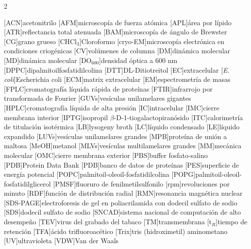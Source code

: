 \begin{multicols}{2}
\begin{acronym}[SDS-PAGE] %
    [ACN]{acetonitrilo}
    [AFM]{microscopía de fuerza atómica}
    [APL]{área por lípido}
    [ATR]{reflectancia total atenuada}
    [BAM]{microscopía de ángulo de Brewster}
    [CG]{grano grueso}
    [CHCl$_3$]{Cloroformo}
    [cryo-EM]{microscopía electrónica en condiciones criogénicas}
    [CV]{volúmenes de columna}
    [DM]{dinámica molecular}
    [MD]{dinámica molecular}
    [DO$_{600}$]{densidad óptica a 600 nm}
    [DPPC]{dipalmitoilfosfatidilcolina}
    [DTT]{DL-Ditiotreitol}
    [EC]{extracelular}
    [\textit{E. coli}]{Escherichia coli}
    [ECM]{matrix extracelular}
    [EM]{espectrometría de masas}
    [FPLC]{cromatografía líquida rápida de proteínas}
    [FTIR]{infrarrojo por transformada de Fourier}
    [GUVs]{vesículas unilamelares gigantes}
    [HPLC]{cromatografía líquida de alta presión}
    [IC]{intracelular}
    [IMC]{cierre membrana interior}
    [IPTG]{isopropil $\beta$-D-1-tiogalactopiranósido}
    [ITC]{calorimetría de titulación isotérmica}
    [LB]{lysogeny broth}
    [LC]{líquido condensado}
    [LE]{líquido expandido}
    [LUVs]{vesículas unilamelares grandes}
    [MPB]{proteína de unión a maltosa}
    [MeOH]{metanol}
    [MLVs]{vesículas multilamelares grandes}
    [MM]{mecánica molecular}
    [OMC]{cierre membrana exterior}
    [PBS]{buffer fosfato-salino}
    [PDB]{Protein Data Bank}
    [PDB]{banco de datos de proteínas}
    [PES]{superficie de energía potencial}
    [POPC]{palmitoil-oleoil-fosfatidilcolina}
    [POPG]{palmitoil-oleoil-fosfatidilglicerol}
    [PMSF]{fluoruro de fenilmetilsulfonilo}
    [rpm]{revoluciones por minuto}
    [RDF]{función de distribución radial}
    [RMN]{resonancia magnética nuclear}
    [SDS-PAGE]{electroforesis de gel en poliacrilamida con dodecil sulfato de sodio}
    [SDS]{dodecil sulfato de sodio}
    [SNCAD]{sistema nacional de computación de alto desempeño}
    [TEV]{virus del grabado del tabaco}
    [TM]{transmembrana}
    [t$_R$]{tiempo de retención}
    [TFA]{ácido trifluoroacético}
    [Trix]{tris (hidroximetil) aminometano}
    [UV]{ultravioleta}
    [VDW]{Van der Waals}
\end{acronym}
\end{multicols}
